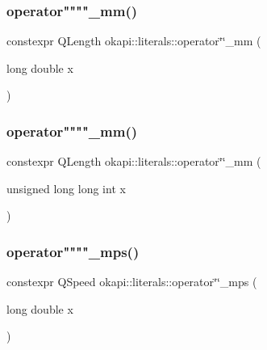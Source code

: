 \mbox{\label{namespaceokapi_1_1literals_a6ac5a9af7e878103516a17c4f76e4cb2}} 
\subsubsection{\texorpdfstring{operator""""\_mm()}{operator""\_mm()}\hspace{0.1cm}{\footnotesize\ttfamily [1/2]}}
{\footnotesize\ttfamily constexpr Q\+Length okapi\+::literals\+::operator\char`\"{}\char`\"{}\+\_\+mm (\begin{DoxyParamCaption}\item[{long double}]{x }\end{DoxyParamCaption})}

\mbox{\label{namespaceokapi_1_1literals_a509f84df84a03f3a4fc1d5004d73ff05}} 
\subsubsection{\texorpdfstring{operator""""\_mm()}{operator""\_mm()}\hspace{0.1cm}{\footnotesize\ttfamily [2/2]}}
{\footnotesize\ttfamily constexpr Q\+Length okapi\+::literals\+::operator\char`\"{}\char`\"{}\+\_\+mm (\begin{DoxyParamCaption}\item[{unsigned long long int}]{x }\end{DoxyParamCaption})}

\mbox{\label{namespaceokapi_1_1literals_a22ab9532837f0c5ac3327e6acfbc0b54}} 
\subsubsection{\texorpdfstring{operator""""\_mps()}{operator""\_mps()}\hspace{0.1cm}{\footnotesize\ttfamily [1/2]}}
{\footnotesize\ttfamily constexpr Q\+Speed okapi\+::literals\+::operator\char`\"{}\char`\"{}\+\_\+mps (\begin{DoxyParamCaption}\item[{long double}]{x }\end{DoxyParamCaption})}

